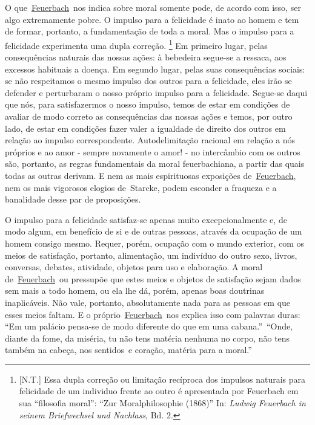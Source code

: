 O
que~\href{https://www.marxists.org/portugues/dicionario/verbetes/f/feuerbach.htm}{Feuerbach}~nos
indica sobre moral somente pode, de acordo com isso, ser algo
extremamente pobre. O impulso para a felicidade é inato ao homem e tem
de formar, portanto, a fundamentação de toda a moral. Mas o impulso para
a felicidade experimenta uma dupla correção. \footnote{{[}N.T.{]} Essa
  dupla correção ou limitação recíproca dos impulsos naturais para
  felicidade de um individuo frente ao outro é apresentada por Feuerbach
  em sua ``filosofia moral'': ``Zur Moralphilosophie (1868)'' In:
  \emph{Ludwig Feuerbach in seinem Briefwechsel und Nachlass}, Bd. 2.}
Em primeiro lugar, pelas consequências naturais das nossas ações: à
bebedeira segue-se a ressaca, aos excessos habituais a doença. Em
segundo lugar, pelas suas consequências sociais: se não respeitamos o
mesmo impulso dos outros para a felicidade, eles irão se defender e
perturbaram o nosso próprio impulso para a felicidade. Segue-se daqui
que nós, para satisfazermos o nosso impulso, temos de estar em condições
de avaliar de modo correto as consequências das nossas ações e temos,
por outro lado, de estar em condições fazer valer a igualdade de direito
dos outros em relação ao impulso correspondente. Autodelimitação
racional em relação a nós próprios e ao amor - sempre novamente o amor!
- no intercâmbio com os outros são, portanto, as regras fundamentais da
moral feuerbachiana, a partir das quais todas as outras derivam. E nem
as mais espirituosas exposições
de~\href{https://www.marxists.org/portugues/dicionario/verbetes/f/feuerbach.htm}{Feuerbach},
nem os mais vigorosos elogios de~Starcke, podem esconder a fraqueza e a
banalidade desse par de proposições.

O impulso para a felicidade satisfaz-se apenas muito excepcionalmente e,
de modo algum, em benefício de si e de outras pessoas, através da
ocupação de um homem consigo mesmo. Requer, porém, ocupação com o mundo
exterior, com os meios de satisfação, portanto, alimentação, um
indivíduo do outro sexo, livros, conversas, debates, atividade, objetos
para uso e elaboração. A moral
de~\href{https://www.marxists.org/portugues/dicionario/verbetes/f/feuerbach.htm}{Feuerbach}~ou
pressupõe que estes meios e objetos de satisfação sejam dados sem mais a
todo homem, ou ela lhe dá, porém, apenas boas doutrinas inaplicáveis.
Não vale, portanto, absolutamente nada para as pessoas em que esses
meios faltam. E o
próprio~\href{https://www.marxists.org/portugues/dicionario/verbetes/f/feuerbach.htm}{Feuerbach}~nos
explica isso com palavras duras: ``Em um palácio pensa-se de modo
diferente do que em uma cabana.''~``Onde, diante da fome, da miséria, tu
não tens matéria nenhuma no corpo, não tens também na cabeça, nos
sentidos~e coração, matéria para a moral.''
\protect\hypertarget{r26}{}{}


